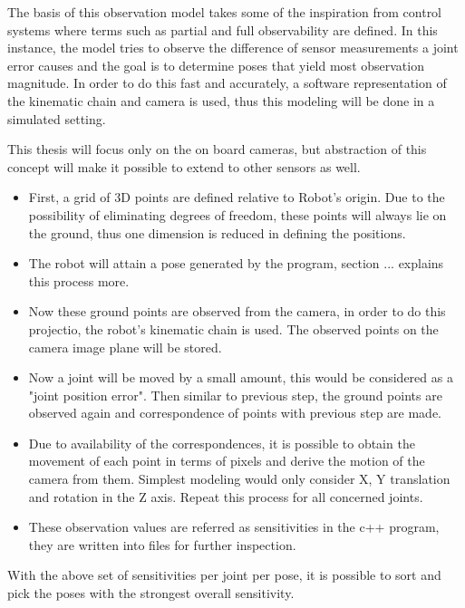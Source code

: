 \documentclass[english, printversion, nomenclature, notitle]{tuvisionthesis} %
\begin{document}

The basis of this observation model takes some of the inspiration from control systems where terms such as partial and full observability are defined. In this instance, the model tries to observe the difference of sensor measurements a joint error causes and the goal is to determine poses that yield most observation magnitude. In order to do this fast and accurately, a software representation of the kinematic chain and camera is used, thus this modeling will be done in a simulated setting.

This thesis will focus only on the on board cameras, but abstraction of this concept will make it possible to extend to other sensors as well.

\begin{itemize}
	\item First, a grid of 3D points are defined relative to Robot's origin. Due to the possibility of eliminating degrees of freedom, these points will always lie on the ground, thus one dimension is reduced in defining the positions.
	\item The robot will attain a pose generated by the program, section ...  explains this process more.
	\item Now these ground points are observed from the camera, in order to do this projectio, the robot's kinematic chain is used. The observed points on the camera image plane will be stored.
	\item Now a joint will be moved by a small amount, this would be considered as a "joint position error". Then similar to previous step, the ground points are observed again and correspondence of points with previous step are made.
	\item Due to availability of the correspondences, it is possible to obtain the movement of each point in terms of pixels and derive the motion of the camera from them. Simplest modeling would only consider X, Y translation and rotation in the Z axis. Repeat this process for all concerned joints.
	\item These observation values are referred as sensitivities in the c++ program, they are written into files for further inspection.	
\end{itemize}

With the above set of sensitivities per joint per pose, it is possible to sort and pick the poses with the strongest overall sensitivity.

\end{document}
